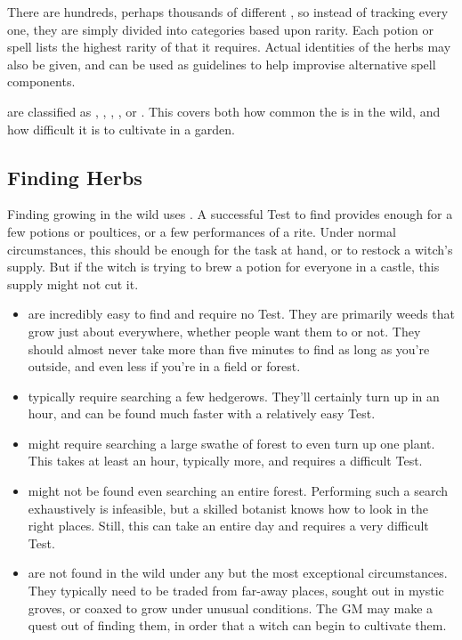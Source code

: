 There are hundreds, perhaps thousands of different , so instead of tracking every one, they are simply divided into categories based upon rarity.
Each potion or spell lists the highest rarity of  that it requires.
Actual identities of the herbs may also be given, and can be used as guidelines to help improvise alternative spell components.

 are classified as , , , , or .
This covers both how common the  is in the wild, and how difficult it is to cultivate in a garden.

\subsection{Finding Herbs}

Finding  growing in the wild uses .
A successful Test to find  provides enough for a few potions or poultices, or a few performances of a rite.
Under normal circumstances, this should be enough for the task at hand, or to restock a witch's supply.
But if the witch is trying to brew a potion for everyone in a castle, this supply might not cut it.

\begin{itemize}
	\item
		 are incredibly easy to find and require no Test.
		They are primarily weeds that grow just about everywhere, whether people want them to or not.
		They should almost never take more than five minutes to find as long as you're outside, and even less if you're in a field or forest.
	\item
		 typically require searching a few hedgerows.
		They'll certainly turn up in an hour, and can be found much faster with a relatively easy Test.
	\item
		 might require searching a large swathe of forest to even turn up one plant.
		This takes at least an hour, typically more, and requires a difficult Test.
	\item
		 might not be found even searching an entire forest.
		Performing such a search exhaustively is infeasible, but a skilled botanist knows how to look in the right places.
		Still, this can take an entire day and requires a very difficult Test.
	\item
		 are not found in the wild under any but the most exceptional circumstances.
		They typically need to be traded from far-away places, sought out in mystic groves, or coaxed to grow under unusual conditions.
		The GM may make a quest out of finding them, in order that a witch can begin to cultivate them.
\end{itemize}

